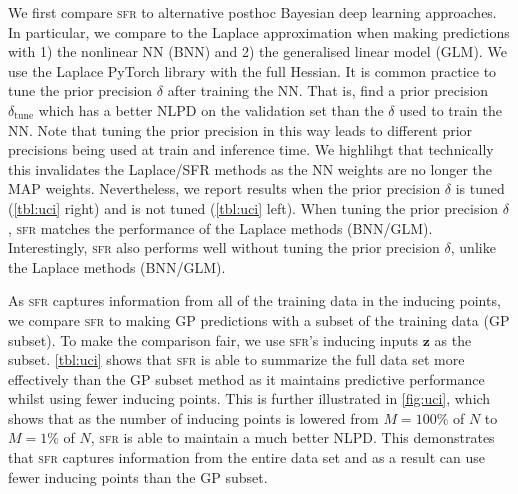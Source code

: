 \documentclass{article}
\newcommand{\our}{\textsc{sfr}\xspace}
\newcommand{\mbf}[1]{\mathbf{#1}}
\newcommand{\vz}{\mbf{z}}
\begin{document}
We first compare \our to alternative posthoc Bayesian deep learning approaches.
In particular, we compare to the Laplace approximation when making predictions with 1) the nonlinear NN (BNN) and 2) the generalised linear model (GLM).
We use the Laplace PyTorch library \citep{daxberger2021laplace} with the full Hessian.%
It is common practice to tune the prior precision $\delta$ after training the NN.
That is, find a prior precision $\delta_{\text{tune}}$ which has a better NLPD on the validation set than the $\delta$ used to train the NN.
Note that tuning the prior precision in this way leads to different prior precisions being used at train and inference time.
We highlihgt that technically this invalidates the Laplace/SFR methods as the NN weights are no longer the MAP weights.
Nevertheless, we report results when the prior precision $\delta$ is tuned (\cref{tbl:uci} right) and is not tuned (\cref{tbl:uci} left).
When tuning the prior precision $\delta$, \our matches the performance of the Laplace methods (BNN/GLM).
Interestingly, \our also  performs well without tuning the prior precision $\delta$, unlike the Laplace methods (BNN/GLM).

As \our captures information from all of the training data in the inducing points, we compare \our to making GP predictions with a subset of the training data (GP subset).
To make the comparison fair, we use \our's inducing inputs $\vz$ as the subset.
\cref{tbl:uci} shows that \our is able to summarize the full data set more effectively than the GP subset method as it maintains predictive performance
whilst using fewer inducing points.
This is further illustrated in \cref{fig:uci}, which shows that as the number of inducing points is lowered from $M=100\%$ of $N$ to $M=1\%$ of $N$,
\our is able to maintain a much better NLPD.
This demonstrates that \our  captures information from the entire data set and as a result can use fewer inducing points than the GP subset.

\end{document}
